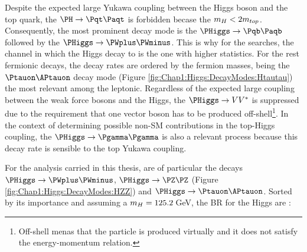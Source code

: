 Despite the expected large Yukawa coupling between the 
Higgs boson and the top quark, the $\PH \rightarrow \ttbar$ is
forbidden becase the $m_{H}<2m_{top}$. Consequently, the most 
prominent decay mode is the $\PHiggs \rightarrow \bbbar$ followed by the
$\PHiggs \rightarrow \PWplus \PWminus$. This is why for the \tHq searches, the 
channel in which the Higgs decay to \bbbar is the one with higher statistics. 
For the rest fermionic decays, the decay rates are ordered by the fermion masses,
being the $\Ptauon\APtauon$ decay mode (Figure \ref{fig:Chap1:Higgs:DecayModes:Htautau}) the most relevant among the leptonic.
Regardless of the expected large coupling between the weak force bosons and the Higgs, the $\PHiggs \rightarrow V V^{*}$ is
suppressed due to the requirement that one vector boson has to be produced off-shell\footnote{Off-shell menas that the particle is produced virtually and it does not satisfy the energy-momentum relation.}. 
In the context of determining possible non-SM \CP contributions in the top-Higgs coupling, 
the $\PHiggs \rightarrow  \Pgamma \Pgamma$ is also a relevant process because this
decay rate is sensible to the top Yukawa coupling.




For the analysis carried in this thesis, are of particular the decays $\PHiggs \rightarrow \PWplus \PWminus$, 
$\PHiggs \rightarrow \PZ \PZ$ (Figure \ref{fig:Chap1:Higgs:DecayModes:HZZ}) and $\PHiggs \rightarrow \Ptauon \APtauon$.
Sorted by its importance and assuming a $m_{H}=125.2\,$GeV, the BR for the Higgs are \cite{MelladoGarcia:2150771}: 


